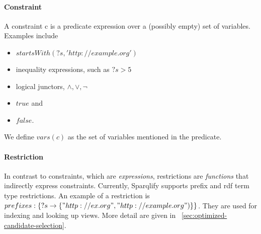 \documentclass[a4paper,twoside,bibtotoc,abstracton,12pt,BCOR=15mm]{scrreprt}
\newcommand{\todo}[1]{\textbf{ToDo: \textit{#1}}}
\begin{document}
\paragraph{Constraint}
A constraint c is a predicate expression over a (possibly empty) set of variables.
Examples include
\begin{itemize}
\item $startsWith(?s, 'http://example.org')$
\item inequality expressions, such as $?s > 5$
\item logical junctors, $\wedge, \vee, \lnot$
\item $true$ and
\item $false$.
\end{itemize}
We define $vars(c)$ as the set of variables mentioned in the predicate.


\paragraph{Restriction}
In contrast to constraints, which are \emph{expressions}, restrictions are \emph{functions} that indirectly express constraints.
Currently, Sparqlify supports prefix and rdf term type restrictions.
An example of a restriction is $prefixes: \left \{ ?s \rightarrow \left \{ "http://ex.org", "http://example.org") \right \} \right \}$.
They are used for indexing and looking up views. More detail are given in ~\autoref{sec:optimized-candidate-selection}.
 




\end{document}

